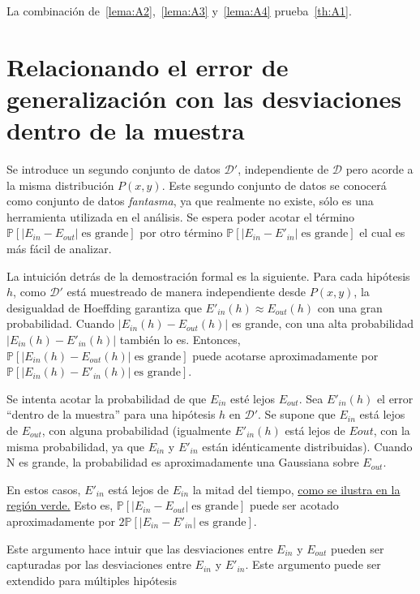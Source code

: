 La combinación de~\ref{lema:A2},~\ref{lema:A3} y~\ref{lema:A4} prueba~\ref{th:A1}.

\section{Relacionando el error de generalización con las desviaciones dentro
de la muestra}

Se introduce un segundo conjunto de datos $\mathcal{D}'$, independiente de
$\mathcal{D}$ pero acorde a la misma distribución $P(x,y)$. Este segundo conjunto
de datos se conocerá como conjunto de datos \emph{fantasma}, ya que realmente
no existe, sólo es una herramienta utilizada en el análisis. Se espera poder
acotar el término $\mathbb{P} \left[| E_{in} - E_{out} | \;\text{es grande} \right]$
por otro término $\mathbb{P} \left[| E_{in} - E'_{in} | \;\text{es grande} \right]$
el cual es más fácil de analizar.

La intuición detrás de la demostración formal es la siguiente. Para cada hipótesis
$h$, como $\mathcal{D}'$ está muestreado de manera independiente desde $P(x,y)$,
la desigualdad de Hoeffding garantiza que $E'_{in}(h) \approx E_{out}(h)$ con
una gran probabilidad. Cuando $| E_{in}(h) - E_{out}(h) |$ es grande, con una
alta probabilidad $| E_{in}(h) - E'_{in}(h) |$ también lo es. Entonces,
$\mathbb{P} \left[| E_{in}(h) - E_{out}(h) | \;\text{es grande} \right]$ puede acotarse aproximadamente por
$\mathbb{P} \left[| E_{in}(h) - E'_{in}(h) | \;\text{es grande} \right]$.


Se intenta acotar la probabilidad de que $E_{in}$ esté lejos $E_{out}$. Sea
$E'_{in}(h)$ el error ``dentro de la muestra'' para una hipótesis $h$ en $\mathcal{D}'$.
Se supone que $E_{in}$ está lejos de $E_{out}$, con alguna probabilidad
(igualmente $E'_{in}(h)$ está lejos de $E{out}$, con la misma probabilidad, ya
que $E_{in}$ y $E'_{in}$ están idénticamente distribuidas). Cuando N es grande,
la probabilidad es aproximadamente una Gaussiana sobre $E_{out}$.


En estos casos, $E'_{in}$ está lejos de $E_{in}$ la mitad del tiempo,
\underline{como se ilustra en la región verde.} Esto es,
$\mathbb{P} \left[| E_{in} - E_{out} | \;\text{es grande} \right]$
puede ser acotado aproximadamente por
$2   \mathbb{P} \left[| E_{in} - E'_{in} | \;\text{es grande} \right]$.

Este argumento hace intuir que las desviaciones entre $E_{in}$ y $E_{out}$ pueden
ser capturadas por las desviaciones entre $E_{in}$ y $E'_{in}$.
Este argumento puede ser extendido para múltiples hipótesis


